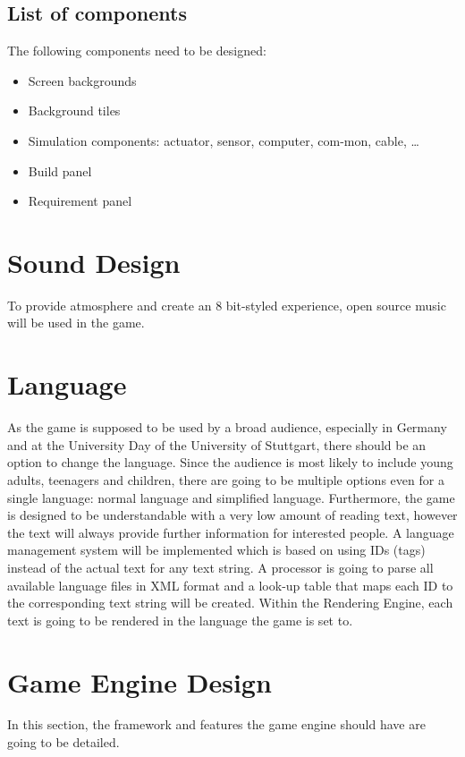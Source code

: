 \subsection{List of components}\label{subsec:list-of-components}
The following components need to be designed:
\begin{itemize}
    \item Screen backgrounds
    \item Background tiles
    \item Simulation components: actuator, sensor, computer, com-mon, cable, \ldots
    \item Build panel
    \item Requirement panel
\end{itemize}

\section{Sound Design}\label{sec:sound-design}
To provide atmosphere and create an 8 bit-styled experience, open source music will be used in the game.

\section{Language}\label{sec:language}
As the game is supposed to be used by a broad audience, especially in Germany and at the University Day of the University of Stuttgart, there should be an option
to change the language.
Since the audience is most likely to include young adults, teenagers and children, there are going to be multiple options even for a single language:
normal language and simplified language.
Furthermore, the game is designed to be understandable with a very low amount of reading text, however the text will always provide further information for interested people.
A language management system will be implemented which is based on using IDs (tags) instead of the actual text for any text string.
A processor is going to parse all available language files in XML format and a look-up table that maps each ID to the corresponding text string will be created.
Within the Rendering Engine, each text is going to be rendered in the language the game is set to.

\section{Game Engine Design}\label{sec:game-engine-design}
In this section, the framework and features the game engine should have are going to be detailed.

